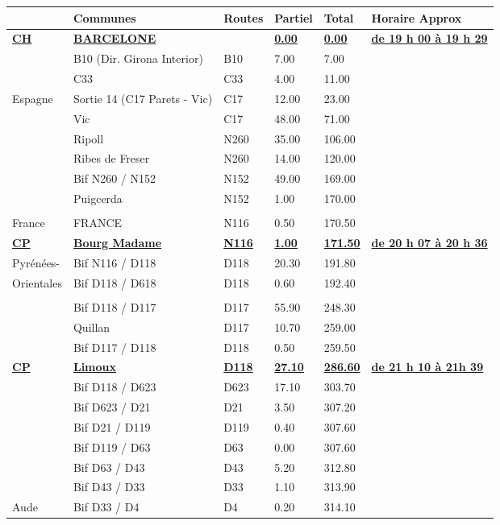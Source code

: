 \documentclass{article}%
\begin{document}
\begin{longtable}{p{2.25cm}|p{5.7cm}|p{3.0cm}|p{1.5cm}|p{1.5cm}|p{3.5cm}}%
\hline%
&Communes&Routes&Partiel&Total&Horaire Approx\\%
\hline%
\endhead%
\endfoot%
\endlastfoot%
\textbf{\underline{﻿CH}}&\textbf{\underline{BARCELONE}}& &\textbf{\underline{0.00}}&\textbf{\underline{0.00}}&\textbf{\underline{de 19 h 00 à 19 h 29}}\\%
 &B10 (Dir. Girona Interior)&B10&7.00&7.00& \\%
 &C33&C33&4.00&11.00& \\%
Espagne&Sortie 14 (C17 Parets - Vic)&C17&12.00&23.00& \\%
 &Vic&C17 &48.00&71.00& \\%
 &Ripoll&N260&35.00&106.00& \\%
 &Ribes de Freser&N260&14.00&120.00& \\%
 &Bif N260 / N152&N152&49.00&169.00& \\%
 &Puigcerda&N152&1.00&170.00& \\%
\hline& & & & & \\%
France&FRANCE &N116&0.50&170.50& \\%
\textbf{\underline{CP}}&\textbf{\underline{Bourg Madame}}&\textbf{\underline{N116}}&\textbf{\underline{1.00}}&\textbf{\underline{171.50}}&\textbf{\underline{de 20 h 07 à 20 h 36}}\\%
Pyrénées-&Bif N116 / D118&D118&20.30&191.80& \\%
Orientales&Bif D118 / D618&D118&0.60&192.40& \\%
\hline& & & & & \\%
 &Bif D118 / D117&D117&55.90&248.30& \\%
 &Quillan&D117&10.70&259.00& \\%
 &Bif D117 / D118&D118&0.50&259.50& \\%
\textbf{\underline{CP}}&\textbf{\underline{Limoux }}&\textbf{\underline{D118}}&\textbf{\underline{27.10}}&\textbf{\underline{286.60}}&\textbf{\underline{de 21 h 10 à 21h 39}}\\%
 &Bif D118 / D623&D623&17.10&303.70& \\%
 &Bif D623 / D21&D21&3.50&307.20& \\%
 &Bif D21 / D119 &D119&0.40&307.60& \\%
 &Bif D119 / D63&D63&0.00&307.60& \\%
 &Bif D63 / D43&D43&5.20&312.80& \\%
 &Bif D43 / D33&D33&1.10&313.90& \\%
Aude &Bif D33 / D4&D4&0.20&314.10& \\%

\end{longtable}
\end{document}
